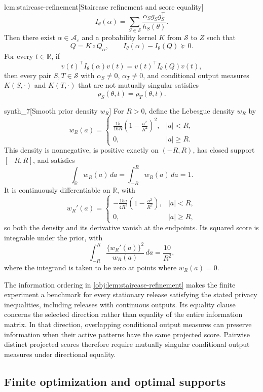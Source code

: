 \begin{lemmav}{lem:staircase-refinement}[Staircase refinement and score equality]
\[
I_\theta(\alpha)
=
\sum_{S\in\mathcal S}
\frac{\alpha_S g_Sg_S^\top}{h_S(\theta)}.
\]
Then there exist \(\alpha\in\mathcal A_\varepsilon\) and a probability kernel \(K\) from \(\mathcal S\) to \(Z\) such that
\[
Q=K\circ Q_\alpha,
\qquad
I_\theta(\alpha)-I_\theta(Q)\succeq0.
\]
For every \(t\in\mathbb R\), if
\[
v(t)^\top I_\theta(\alpha)v(t)
=
v(t)^\top I_\theta(Q)v(t),
\]
then every pair \(S,T\in\mathcal S\) with \(\alpha_S\ne0\), \(\alpha_T\ne0\), and conditional output measures \(K(S,\cdot)\) and \(K(T,\cdot)\) that are not mutually singular satisfies
\[
\rho_S(\theta,t)=\rho_T(\theta,t).
\]
\end{lemmav}

\begin{definitionv}{synth_7}[Smooth prior density \(w_R\)]
For \(R>0\), define the Lebesgue density \(w_R\) by
\[
w_R(a)=
\begin{cases}
\displaystyle\frac{15}{16R}\left(1-\frac{a^2}{R^2}\right)^2,
& |a|<R,\\[6pt]
0,& |a|\ge R.
\end{cases}
\]
This density is nonnegative, is positive exactly on \((-R,R)\), has closed support \([-R,R]\), and satisfies
\[
\int_{\mathbb R}w_R(a)\,da
=\int_{-R}^{R}w_R(a)\,da=1.
\]
It is continuously differentiable on \(\mathbb R\), with
\[
w_R'(a)=
\begin{cases}
\displaystyle-\frac{15a}{4R^3}\left(1-\frac{a^2}{R^2}\right),
& |a|<R,\\[6pt]
0,& |a|\ge R,
\end{cases}
\]
so both the density and its derivative vanish at the endpoints. Its squared score is integrable under the prior, with
\[
\int_{-R}^{R}
\frac{\{w_R'(a)\}^2}{w_R(a)}\,da=\frac{10}{R^2},
\]
where the integrand is taken to be zero at points where \(w_R(a)=0\).
\end{definitionv}

The information ordering in \cref{obj:lem:staircase-refinement} makes the finite experiment a benchmark for every stationary release satisfying the stated privacy inequalities, including releases with continuous outputs. Its equality clause concerns the selected direction rather than equality of the entire information matrix. In that direction, overlapping conditional output measures can preserve information when their active patterns have the same projected score. Pairwise distinct projected scores therefore require mutually singular conditional output measures under directional equality.

\subsection{Finite optimization and optimal supports}

